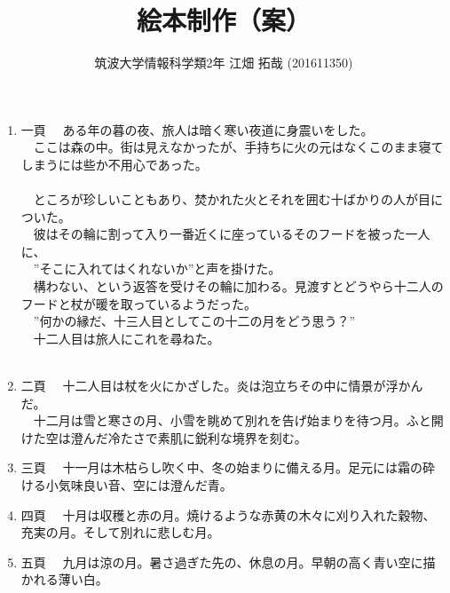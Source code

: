 \documentclass{tarticle}
\author{筑波大学情報科学類2年 江畑 拓哉 (201611350)}
\date{}
\title{絵本制作（案）}
\begin{document}
\maketitle
\begin{enumerate}
\item 一頁
\label{sec:org6dd1070}
\newline
　ある年の暮の夜、旅人は暗く寒い夜道に身震いをした。\\
　ここは森の中。街は見えなかったが、手持ちに火の元はなくこのまま寝てしまうには些か不用心であった。\\
　\\
　ところが珍しいこともあり、焚かれた火とそれを囲む十ばかりの人が目についた。\\
　彼はその輪に割って入り一番近くに座っているそのフードを被った一人に、\\
　”そこに入れてはくれないか”と声を掛けた。\\
　構わない、という返答を受けその輪に加わる。見渡すとどうやら十二人のフードと杖が暖を取っているようだった。\\
　”何かの縁だ、十三人目としてこの十二の月をどう思う？”\\
　十二人目は旅人にこれを尋ねた。\\
　\\
\item 二頁
\label{sec:orgc4717b5}
\newline
　十二人目は杖を火にかざした。炎は泡立ちその中に情景が浮かんだ。\\

　十二月は雪と寒さの月、小雪を眺めて別れを告げ始まりを待つ月。ふと開けた空は澄んだ冷たさで素肌に鋭利な境界を刻む。\\

\item 三頁
\label{sec:orge3f75a5}
\newline
　十一月は木枯らし吹く中、冬の始まりに備える月。足元には霜の砕ける小気味良い音、空には澄んだ青。\\

\item 四頁
\label{sec:org2356b35}
\newline
　十月は収穫と赤の月。焼けるような赤黄の木々に刈り入れた穀物、充実の月。そして別れに悲しむ月。\\

\item 五頁
\label{sec:org9fbbfa2}
\newline
　九月は涼の月。暑さ過ぎた先の、休息の月。早朝の高く青い空に描かれる薄い白。\\


\end{enumerate}
\end{document}
